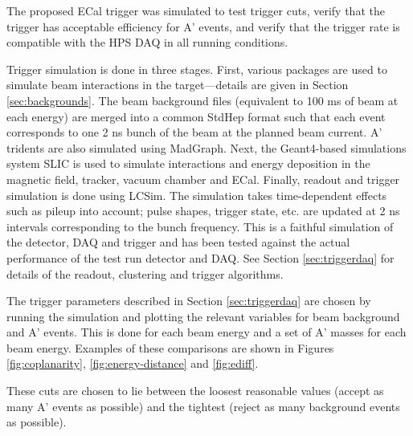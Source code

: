 
The proposed ECal trigger was simulated to test trigger cuts, verify that the trigger has acceptable efficiency for A' events, and verify that the trigger rate is compatible with the HPS DAQ in all running conditions.

Trigger simulation is done in three stages. 
First, various packages are used to simulate beam interactions in the target---details are given in Section \ref{sec:backgrounds}.
The beam background files (equivalent to 100 ms of beam at each energy) are merged into a common StdHep format such that each event corresponds to one 2 ns bunch of the beam at the planned beam current.
A' tridents are also simulated using MadGraph. 
Next, the Geant4-based simulations system SLIC \cite{slic} is used to simulate interactions and energy deposition in the magnetic field, tracker, vacuum chamber and ECal. 
Finally, readout and trigger simulation is done using LCSim. The simulation takes time-dependent effects such as pileup into account; pulse shapes, trigger state, etc. are updated at 2 ns intervals corresponding to the bunch frequency.
This is a faithful simulation of the detector, DAQ and trigger and has been tested against the actual performance of the test run detector and DAQ. See Section \ref{sec:triggerdaq} for details of the readout, clustering and trigger algorithms.

The trigger parameters described in Section \ref{sec:triggerdaq} are chosen by running the simulation and plotting the relevant variables for beam background and A' events. 
This is done for each beam energy and a set of A' masses for each beam energy. Examples of these comparisons are shown in Figures \ref{fig:coplanarity}, \ref{fig:energy-distance} and \ref{fig:ediff}.

These cuts are chosen to lie between the loosest reasonable values (accept as many A' events as possible) and the tightest (reject as many background events as possible). 

